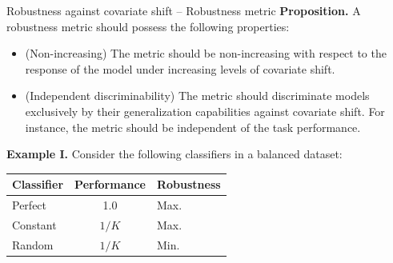\begin{frame}{Robustness against covariate shift -- Robustness metric}
	\textbf{Proposition.} A robustness metric should possess the following properties:
	\begin{itemize}
		\item[P1](Non-increasing) The metric should be non-increasing with respect to the
		response of the model under increasing levels of covariate shift.
		\item[P2](Independent discriminability) The metric should discriminate models exclusively by their generalization capabilities against 
		covariate shift. For instance, the metric should be independent of the task
		performance.
	\end{itemize}

	\vspace{0.5cm}


	\textbf{Example I.} Consider the following classifiers in a balanced dataset:
	\begin{table}[H]
		\centering
		\begin{tabular}{l|c|l}
		Classifier & Performance & Robustness \\
		\midrule
		Perfect   & 1.0  & Max.  \\
		Constant  & $1/K$  & Max.   \\
		Random    & $1/K$   & Min.   \\
		\bottomrule
		\end{tabular}
	\end{table}

\end{frame}

